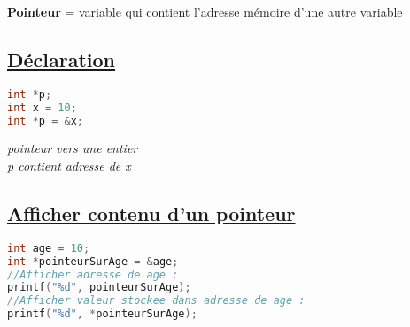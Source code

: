 \documentclass[a3paper,12pt]{article}
\begin{document}
\newpage
\noindent
\begin{minipage}[t]{0.5\textwidth}
\vspace{0pt}
\begin{tcolorbox}[title=Pointeurs, fonttitle=\large, top=0pt, bottom=0pt, boxsep=1pt, colback=white,
  colframe=tale, 
  colbacktitle=tale,
  coltitle=white,]
  \vspace{0.5em}
  \textbf{Pointeur} = variable qui contient l’adresse mémoire d’une autre variable
\vspace{-2em}
\subsection*{{\small \underline{Déclaration}}}
\vspace{-1.25em}
\noindent
\begin{minipage}[t]{0.5\textwidth} 
\begin{lstlisting}[language=C, basicstyle=\normalsize, aboveskip=0pt, belowskip=0pt]
int *p;
int x = 10;
int *p = &x;
\end{lstlisting}
\end{minipage}%
\hspace{4em}
\begin{minipage}[t]{0.45\textwidth}
\vspace{0.15em}
\textit{pointeur vers une entier}\\
\textit{p contient adresse de x}
\end{minipage}
\vspace{-1.5em}
\subsection*{{\small \underline{Afficher contenu d'un pointeur}}}
\noindent
\begin{lstlisting}[language=C, basicstyle=\normalsize, aboveskip=0pt, belowskip=20pt]
int age = 10;
int *pointeurSurAge = &age;
//Afficher adresse de age :
printf("%d", pointeurSurAge);
//Afficher valeur stockee dans adresse de age :
printf("%d", *pointeurSurAge);
\end{lstlisting}
\vspace{-1.5em}
  \end{tcolorbox}
  
  \begin{tcolorbox}[title=Tableaux, fonttitle=\large, top=5pt, bottom=0pt, boxsep=1pt, colback=white,
  colframe=blue!40!black!50, 
  colbacktitle=blue!40!black!50,
  coltitle=white]

\end{tcolorbox}
\end{minipage}
\end{document}
